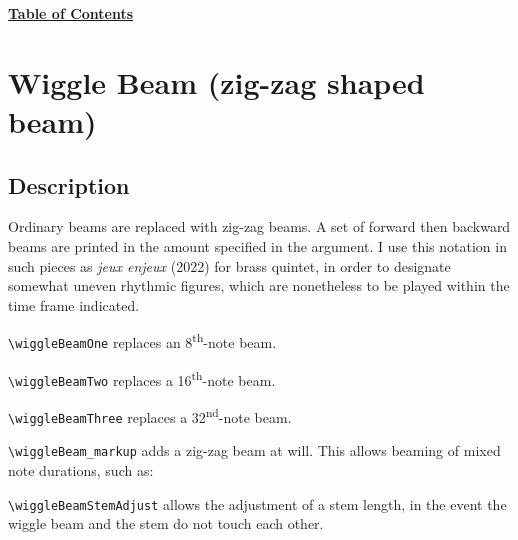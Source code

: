 \hyperref[sec:toc]{\textbf{Table of Contents}}


\section {Wiggle Beam (zig-zag shaped beam)}
\hfill
{}
\hfill

\subsection{Description}
Ordinary beams are replaced with zig-zag beams. A set of forward then backward beams are printed in the amount specified in the argument. I use this notation in such pieces as \textit{jeux enjeux} (2022) for brass quintet, in order to designate somewhat uneven rhythmic figures, which are nonetheless to be played within the time frame indicated. 

\verb|\wiggleBeamOne| replaces an 8\textsuperscript{th}-note beam.

\verb|\wiggleBeamTwo| replaces a 16\textsuperscript{th}-note beam.

\verb|\wiggleBeamThree| replaces a 32\textsuperscript{nd}-note beam.

\verb|\wiggleBeam_markup| adds a zig-zag beam at will. This allows beaming of mixed note durations, such as: \par
\verb|\wiggleBeamStemAdjust| allows the adjustment of a stem length, in the event the wiggle beam and the stem do not touch each other. 

